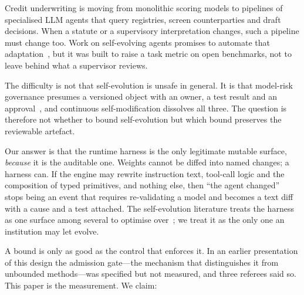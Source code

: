 \documentclass[11pt]{article}
\begin{document}
Credit underwriting is moving from monolithic scoring models to pipelines of specialised LLM agents that query registries, screen counterparties and draft decisions. When a statute or a supervisory interpretation changes, such a pipeline must change too. Work on self-evolving agents promises to automate that adaptation~\cite{fang2025survey,gao2025survey}, but it was built to raise a task metric on open benchmarks, not to leave behind what a supervisor reviews.

The difficulty is not that self-evolution is unsafe in general. It is that model-risk governance presumes a versioned object with an owner, a test result and an approval~\cite{sr262,euaiact}, and continuous self-modification dissolves all three. The question is therefore not whether to bound self-evolution but which bound preserves the reviewable artefact.

Our answer is that the runtime harness is the only legitimate mutable surface, \emph{because} it is the auditable one. Weights cannot be diffed into named changes; a harness can. If the engine may rewrite instruction text, tool-call logic and the composition of typed primitives, and nothing else, then ``the agent changed'' stops being an event that requires re-validating a model and becomes a text diff with a cause and a test attached. The self-evolution literature treats the harness as one surface among several to optimise over~\cite{selfharness,harnessx,gepa}; we treat it as the only one an institution may let evolve.

A bound is only as good as the control that enforces it. In an earlier presentation of this design the admission gate---the mechanism that distinguishes it from unbounded methods---was specified but not measured, and three referees said so. This paper is the measurement. We claim:
\end{document}
